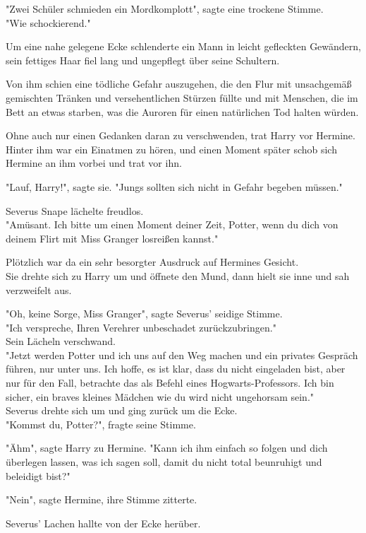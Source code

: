 {"Zwei Schüler schmieden ein Mordkomplott", sagte eine trockene Stimme.\\ "Wie schockierend."

Um eine nahe gelegene Ecke schlenderte ein Mann in leicht gefleckten Gewändern, sein fettiges Haar fiel lang und ungepflegt über seine Schultern.

Von ihm schien eine tödliche Gefahr auszugehen, die den Flur mit unsachgemäß gemischten Tränken und versehentlichen Stürzen füllte und mit Menschen, die im Bett an etwas starben, was die Auroren für einen natürlichen Tod halten würden.

Ohne auch nur einen Gedanken daran zu verschwenden, trat Harry vor Hermine. Hinter ihm war ein Einatmen zu hören, und einen Moment später schob sich Hermine an ihm vorbei und trat vor ihn.

"Lauf, Harry!", sagte sie. "Jungs sollten sich nicht in Gefahr begeben müssen."

Severus Snape lächelte freudlos.\\ "Amüsant. Ich bitte um einen Moment deiner Zeit, Potter, wenn du dich von deinem Flirt mit Miss Granger losreißen kannst."

Plötzlich war da ein sehr besorgter Ausdruck auf Hermines Gesicht.\\ Sie drehte sich zu Harry um und öffnete den Mund, dann hielt sie inne und sah verzweifelt aus.

"Oh, keine Sorge, Miss Granger", sagte Severus' seidige Stimme.\\ "Ich verspreche, Ihren Verehrer unbeschadet zurückzubringen."\\ Sein Lächeln verschwand.\\ "Jetzt werden Potter und ich uns auf den Weg machen und ein privates Gespräch führen, nur unter uns. Ich hoffe, es ist klar, dass du nicht eingeladen bist, aber nur für den Fall, betrachte das als Befehl eines Hogwarts-Professors. Ich bin sicher, ein braves kleines Mädchen wie du wird nicht ungehorsam sein."\\ Severus drehte sich um und ging zurück um die Ecke.\\ "Kommst du, Potter?", fragte seine Stimme.

"Ähm", sagte Harry zu Hermine. "Kann ich ihm einfach so folgen und dich überlegen lassen, was ich sagen soll, damit du nicht total beunruhigt und beleidigt bist?"

"Nein", sagte Hermine, ihre Stimme zitterte.

Severus' Lachen hallte von der Ecke herüber.

}
